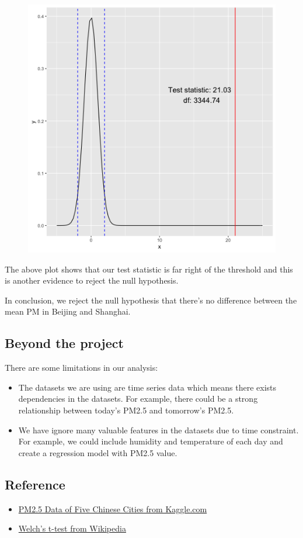 \documentclass[]{article}
\begin{document}
\begin{figure}
\centering
\includegraphics{../results/testplot.png}
\caption{}
\end{figure}

The above plot shows that our test statistic is far right of the
threshold and this is another evidence to reject the null hypothesis.

In conclusion, we reject the null hypothesis that there's no difference
between the mean PM in Beijing and Shanghai.

\subsection{Beyond the project}\label{beyond-the-project}

There are some limitations in our analysis:

\begin{itemize}
\item
  The datasets we are using are time series data which means there
  exists dependencies in the datasets. For example, there could be a
  strong relationship between today's PM2.5 and tomorrow's PM2.5.
\item
  We have ignore many valuable features in the datasets due to time
  constraint. For example, we could include humidity and temperature of
  each day and create a regression model with PM2.5 value.
\end{itemize}

\subsection{Reference}\label{reference}

\begin{itemize}
\item
  \href{https://www.kaggle.com/uciml/pm25-data-for-five-chinese-cities}{PM2.5
  Data of Five Chinese Cities from Kaggle.com}
\item
  \href{https://en.wikipedia.org/wiki/Welch\%27s_t-test}{Welch's t-test
  from Wikipedia}
\end{itemize}
\end{document}
